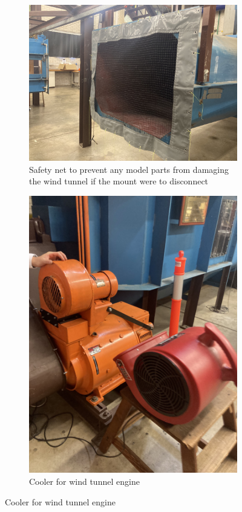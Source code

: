 \begin{figure}[H]
\centering
\begin{subfigure}[b]{0.3\textwidth}
    \centering
    \includegraphics[scale =0.05]{04_Methodology/Figs/windTunnelNet.jpg}
    \caption{Safety net to prevent any model parts from damaging the wind tunnel if the mount were to disconnect}
    \label{fig:windTunnelNet}
\end{subfigure}

\hfill
\begin{subfigure}[b]{0.3\textwidth}
     \centering
    \includegraphics[scale=0.1]{04_Methodology/Figs/cooler.jpg}
    \caption{Cooler for wind tunnel engine}
    \label{fig:engineCooler}
\end{subfigure}
\hfill
    

\end{figure}
